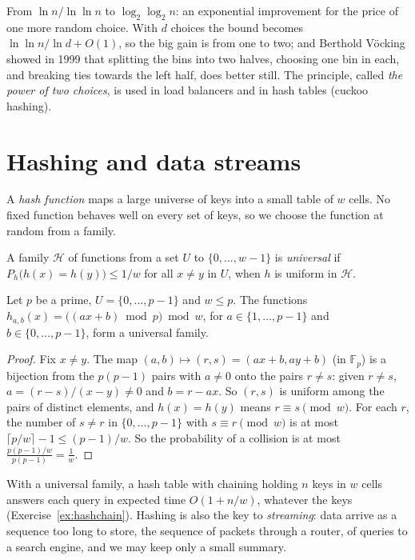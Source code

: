 From $\ln n/\ln\ln n$ to $\log_2\log_2n$: an exponential improvement for the price of one more random choice. With $d$ choices the bound becomes $\ln\ln n/\ln d+O(1)$, so the big gain is from one to two; and Berthold V\"ocking showed in 1999 that splitting the bins into two halves, choosing one bin in each, and breaking ties
towards the left half, does better still. The principle, called \emph{the power of two choices}, is used in load balancers and in hash tables (cuckoo hashing).

\section{Hashing and data streams}\label{sec:streams}

A \emph{hash function} maps a large universe of keys into a small table of $w$ cells. No fixed function behaves well on every set of keys, so we choose the function at random from a family.

\begin{definition}
A family $\mathcal H$ of functions from a set $U$ to $\{0,\dots,w-1\}$ is \emph{universal} if $P_h\bigl(h(x)=h(y)\bigr)\le1/w$ for all $x\ne y$ in $U$, when $h$ is uniform in $\mathcal H$.
\end{definition}

\begin{proposition}\label{prop:universal}
Let $p$ be a prime, $U=\{0,\dots,p-1\}$ and $w\le p$. The functions $h_{a,b}(x)=\bigl((ax+b)\bmod p\bigr)\bmod w$, for $a\in\{1,\dots,p-1\}$ and $b\in\{0,\dots,p-1\}$, form a universal family.
\end{proposition}
\begin{proof}
Fix $x\ne y$. The map $(a,b)\mapsto(r,s)=(ax+b,ay+b)$ (in $\mathbb F_p$) is a bijection from the $p(p-1)$ pairs with $a\ne0$ onto the pairs $r\ne s$: given $r\ne s$, $a=(r-s)/(x-y)\ne0$ and $b=r-ax$. So $(r,s)$ is uniform among the pairs of distinct elements, and
$h(x)=h(y)$ means $r\equiv s\pmod w$. For each $r$, the number of $s\ne r$ in $\{0,\dots,p-1\}$ with $s\equiv r\pmod w$ is at most $\lceil p/w\rceil-1\le(p-1)/w$. So the probability of a collision is at most $\frac{p(p-1)/w}{p(p-1)}=\frac1w$.
\end{proof}

With a universal family, a hash table with chaining holding $n$ keys in $w$ cells answers each query in expected time $O(1+n/w)$, whatever the keys (Exercise~\ref{ex:hashchain}). Hashing is also the key to \emph{streaming}: data arrive as a sequence too long to store, the sequence of
packets through a router, of queries to a search engine, and we may keep only a small summary.

